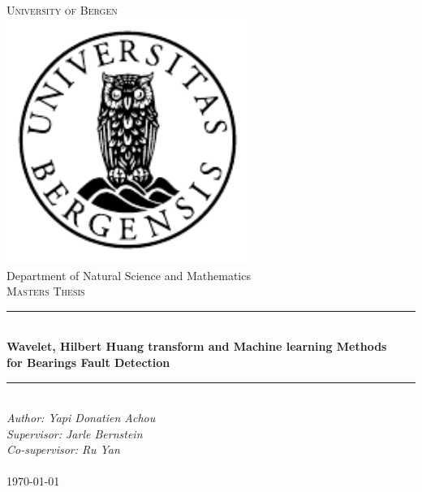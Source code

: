 \documentclass[../Main/thesis.tex]{subfiles}
\begin{document}

\newcommand{\HRule}{\rule{\linewidth}{0.5mm}}

\begin{titlepage}
\begin{center}
\textsc{\Huge University of Bergen}\\[0.4cm]
\includegraphics[width=8cm]{../fig/uib} \\[0.5cm]

\large Department of Natural Science and Mathematics\\[0.7cm]
\textsc{\huge Masters Thesis}\\[0.4cm]
\HRule \\[0.4cm]
{ \huge \bfseries Wavelet, Hilbert Huang transform and Machine learning Methods\\ for Bearings Fault Detection}\\[0.5cm]
\HRule \\[1.0cm]

\emph{Author: Yapi Donatien Achou}\\
\emph{Supervisor: Jarle Bernstein}\\
\emph{Co-supervisor: Ru Yan}\\

\paragraph*{}
\end{center}
\vfill
\begin{center}
{\large \today}
\end{center}
\end{titlepage}
\end{document}
